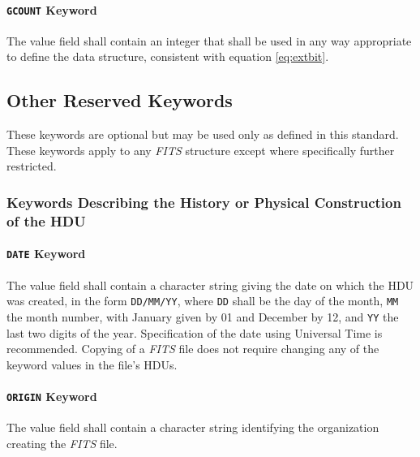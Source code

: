    \paragraph{{\tt GCOUNT} Keyword}
 The value field shall contain an integer that shall be
 used in any way appropriate to define the data structure,
 consistent with equation \ref{eq:extbit}. 
  
\subsection{Other Reserved Keywords}
 \label{s:resk}
   These keywords are optional but may be used 
   only as defined in this standard.
   These keywords apply to any {\em FITS\/} 
   structure 
   except where specifically further restricted.
  
\subsubsection{Keywords Describing the History or Physical
 Construction of the HDU}
 \label{s:dhist}
 \paragraph{{\tt DATE} Keyword}
 The value field shall contain a character 
 string
 giving the date on which the HDU was created, 
 in the form {\tt DD/MM/YY}, 
 where {\tt DD} shall be the day of the month, 
 {\tt MM} the month number,
 with January given by 01 and December by 12, and {\tt YY} 
 the last two digits of the year. Specification of the date 
 using Universal Time is 
 recommended.  Copying of a {\em FITS\/} file does not require changing 
 any of the keyword values in the file's HDUs.
  
 \paragraph{{\tt ORIGIN} Keyword}
 The value field shall contain a character 
 string
 identifying the organization creating the {\em FITS\/} file.
  
